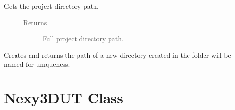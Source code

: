 \documentclass[letterpaper,10pt,english]{sphinxmanual}
\begin{document}
\begin{fulllineitems}
\begin{fulllineitems}
\label{\detokenize{reference_doc:ProjectManager.getProjDir}}
Gets the project directory path.
\begin{quote}\begin{description}
\item[{Returns}] \leavevmode
Full project directory path.

\end{description}\end{quote}

\end{fulllineitems}


\begin{fulllineitems}
\label{\detokenize{reference_doc:ProjectManager.getCaptureDir}}
Creates and returns the path of a new directory created in  the folder will be named  for uniqueness.

\end{fulllineitems}


\end{fulllineitems}



\section{Nexy3DUT Class}
\label{\detokenize{reference_doc:nexy3dut-class}}
\end{document}
